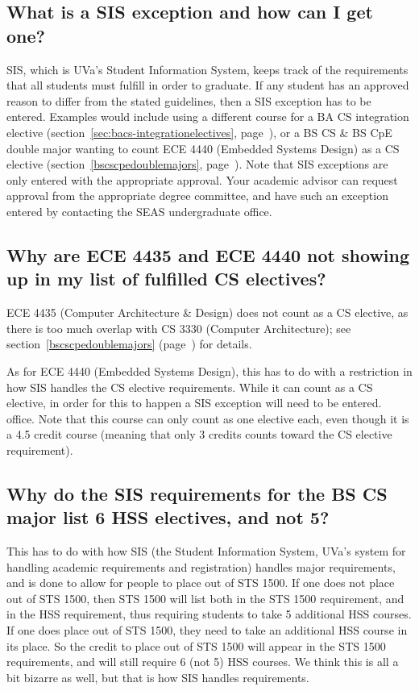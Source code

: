 \documentclass[10pt,letter,twocolumn]{book}
\begin{document}
\subsection{What is a SIS exception and how can I get one?}
\label{sec:sisexceptions}

SIS, which is UVa's Student Information System, keeps track of the
requirements that all students must fulfill in order to graduate.  If
any student has an approved reason to differ from the stated
guidelines, then a SIS exception has to be entered.  Examples would
include using a different course for a BA CS integration elective
(section~\ref{sec:bacs-integrationelectives},
page~\pageref{sec:bacs-integrationelectives}), or a BS CS \& BS CpE
double major wanting to count ECE 4440 (Embedded Systems Design) as a CS
elective (section~\ref{bscscpedoublemajors},
page~\pageref{bscscpedoublemajors}).  Note that SIS exceptions are only
entered with the appropriate approval.  Your academic advisor can
request approval from the appropriate degree committee, and have such
an exception entered by contacting the SEAS undergraduate office.

\subsection{Why are ECE 4435 and ECE 4440 not showing up in my list of
  fulfilled CS electives?}
\label{sec:sisece4435issue}

ECE 4435 (Computer Architecture \& Design) does not count as a CS
elective, as there is too much overlap with CS 3330 (Computer
Architecture); see section~\ref{bscscpedoublemajors}
(page~\pageref{bscscpedoublemajors}) for details.

As for ECE 4440 (Embedded Systems Design), this has to do with a
restriction in how SIS handles the CS elective requirements.  While it
can count as a CS elective, in order for this to happen a SIS
exception will need to be entered. 
office.  Note that this course can only count as one elective each,
even though it is a 4.5 credit course (meaning that only 3 credits
counts toward the CS elective requirement).

\subsection{Why do the SIS requirements for the BS CS major list 6 HSS
  electives, and not 5?}
\label{sec:sishssissue}

This has to do with how SIS (the Student Information System, UVa's
system for handling academic requirements and registration) handles
major requirements, and is done to allow for people to place out of
STS 1500. If one does not place out of STS 1500, then STS 1500 will
list both in the STS 1500 requirement, and in the HSS requirement,
thus requiring students to take 5 additional HSS courses. If one does
place out of STS 1500, they need to take an additional HSS course in
its place. So the credit to place out of STS 1500 will appear in the
STS 1500 requirements, and will still require 6 (not 5) HSS courses.
We think this is all a bit bizarre as well, but that is how SIS
handles requirements.
\end{document}
